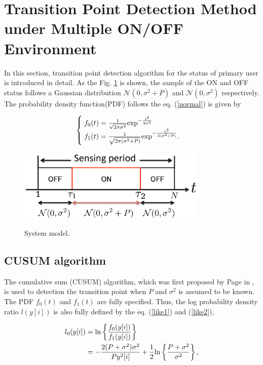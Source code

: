 \section{Transition Point Detection Method under Multiple ON/OFF Environment }    

In this section, transition point detection algorithm for the status of primary user is introduced in detail. As the Fig. \ref{system_model} is shown, the sample of the ON and OFF status follows a Gaussian distribution $\mathcal{N}(0,\sigma^2+P)$ and $\mathcal{N}(0,\sigma^2)$ respectively. The probability density function(PDF) follows the eq. (\ref{normal}) is given by

\begin{align}
\begin{cases}
\;f_0(t) = \frac{1}{\sqrt{2\pi\sigma^2}} \rm{exp}^{-\frac{t^2}{2\sigma^2}} \\
\;f_1(t) = \frac{1}{\sqrt{2\pi(\sigma^2+P)}} \rm{exp}^{-\frac{t^2}{2(\sigma^2+P)}}.
\end{cases}
\label{normal}
\end{align}

\begin{center}
  \begin{figure}[t]
    \centering
    \includegraphics[width=90mm]{systemodel.eps}
    \label{system_model}
    \caption{\normalsize{System model.}}
  \end{figure}
\end{center} 
\subsection{CUSUM algorithm}
The cumulative sum (CUSUM) algorithm, which was first proposed by Page in \cite{CUSUM}, is used to detection the transition point when $P$ and $\sigma^2$ is assumed to be known.
The PDF $f_0(t)$ and $f_1(t)$ are fully specified. Thus, the log probability density ratio $l(y[i])$ is also fully defined by the eq. (\ref{like1}) and (\ref{like2}),

\begin{align}
l_{0}(y[i]) &= {\rm ln}\left\{\frac{f_0(y[i])}{f_1(y[i])}\right\} \label{like1} \\ 
&=-\frac{2(P+\sigma^2)\sigma^2}{Py^2[i]} + \frac{1}{2}{\rm ln}\left\{\frac{P+\sigma^2}{\sigma^2}\right\}, \nonumber
\end{align}


